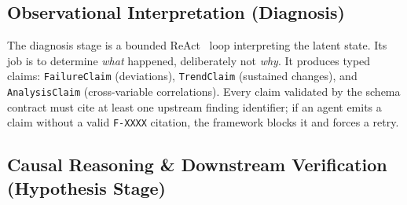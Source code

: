 \documentclass[11pt]{article}
\begin{document}
\subsection{Observational Interpretation (Diagnosis)}

The diagnosis stage is a bounded ReAct~\citep{react} loop interpreting the latent state. Its job is to determine \emph{what} happened, deliberately not \emph{why}. It produces typed claims: \texttt{FailureClaim} (deviations), \texttt{TrendClaim} (sustained changes), and \texttt{AnalysisClaim} (cross-variable correlations). Every claim validated by the schema contract must cite at least one upstream finding identifier; if an agent emits a claim without a valid \texttt{F-XXXX} citation, the framework blocks it and forces a retry.

\subsection{Causal Reasoning \& Downstream Verification (Hypothesis Stage)}
\label{sec:hypothesis-stage}
\end{document}
